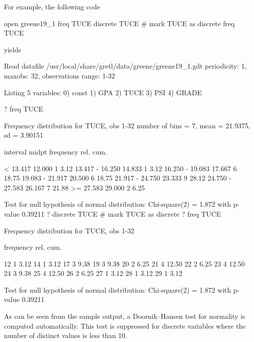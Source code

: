 For example, the following code
%
\begin{code}
open greene19_1
freq TUCE
discrete TUCE # mark TUCE as discrete
freq TUCE
\end{code}
%
yields
%
\begin{code}
Read datafile /usr/local/share/gretl/data/greene/greene19_1.gdt
periodicity: 1, maxobs: 32,
observations range: 1-32

Listing 5 variables:
  0) const    1) GPA      2) TUCE     3) PSI      4) GRADE  

? freq TUCE

Frequency distribution for TUCE, obs 1-32
number of bins = 7, mean = 21.9375, sd = 3.90151

       interval          midpt   frequency    rel.     cum.

          <  13.417     12.000        1      3.12%
    13.417 - 16.250     14.833        1      3.12%
    16.250 - 19.083     17.667        6     18.75%
    19.083 - 21.917     20.500        6     18.75%
    21.917 - 24.750     23.333        9     28.12%
    24.750 - 27.583     26.167        7     21.88%
          >= 27.583     29.000        2      6.25%

Test for null hypothesis of normal distribution:
Chi-square(2) = 1.872 with p-value 0.39211
? discrete TUCE # mark TUCE as discrete
? freq TUCE

Frequency distribution for TUCE, obs 1-32

          frequency    rel.     cum.

  12           1      3.12%
  14           1      3.12%
  17           3      9.38%
  19           3      9.38%
  20           2      6.25%
  21           4     12.50%
  22           2      6.25%
  23           4     12.50%
  24           3      9.38%
  25           4     12.50%
  26           2      6.25%
  27           1      3.12%
  28           1      3.12%
  29           1      3.12%

Test for null hypothesis of normal distribution:
Chi-square(2) = 1.872 with p-value 0.39211
\end{code}
%
As can be seen from the sample output, a Doornik--Hansen test for
normality is computed automatically.  This test is suppressed for
discrete variables where the number of distinct values is less than
10.

